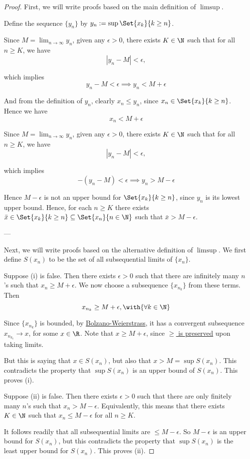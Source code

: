 \begin{proof}
  \def\X{\Set{x_k}{k\geq n}}

  First, we will write proofs based on the main definition of $\limsup$.

  Define the sequence $\{y_n\}$ by $y_n:=\sup\X$.

   Since $M=\displaystyle\lim_{n\to\infty}y_n$, given any
  $\epsilon>0$, there exists $K\in\N$ such that for all $n\geq K$, we have
  $$
    |y_n-M|<\epsilon,
  $$

  which implies
  $$
    y_n-M<\epsilon\implies y_n<M+\epsilon
  $$

  And from the definition of $y_n$, clearly $x_n\leq y_n$, since $x_n\in\X$.
  Hence we have
  $$
    x_n<M+\epsilon
  $$

   Since $M=\displaystyle\lim_{n\to\infty}y_n$, given any
  $\epsilon>0$, there exists $K\in\N$ such that for all $n\geq K$, we have
  $$
    |y_n-M|<\epsilon,
  $$

  which implies
  $$
    -(y_n-M)<\epsilon\implies y_n>M-\epsilon
  $$

  Hence $M-\epsilon$ is not an upper bound for $\X$, since $y_n$ is its lowest
  upper bound. Hence, for each $n\geq K$ there exists $\bar
  x\in\X\subseteq\Set{x_n}{n\in\N}$ such that $\bar x>M-\epsilon$.

  ---

  Next, we will write proofs based on the alternative definition of $\limsup$.
  We first define $S(x_n)$ to be the set of all subsequential limits of
  $\{x_n\}$.

   Suppose (i) is false. Then there exists $\epsilon>0$ such that
  there are infinitely many $n$'s such that $x_n\geq M+\epsilon$. We now choose
  a subsequence $\{x_{n_k}\}$ from these terms. Then
  $$
    x_{n_k}\geq M+\epsilon,\with{\forall k\in\N}
  $$

  Since $\{x_{n_k}\}$ is bounded, by \href{d277ad0}{Bolzano-Weierstrass}, it
  has a convergent subsequence $x_{n_{k_\ell}}\to x$, for some $x\in\R$. Note
  that $x\geq M+\epsilon$, since \href{d88455d}{$\geq$ is preserved} upon
  taking limits.

  But this is saying that $x\in S(x_n)$, but also that $x>M=\sup S(x_n)$. This
  contradicts the property that $\sup S(x_n)$ is an upper bound of $S(x_n)$.
  This proves (i).

   Suppose (ii) is false. Then there exists $\epsilon>0$ such that
  there are only finitely many $n$'s such that $x_n>M-\epsilon$. Equivalently,
  this means that there exists $K\in\N$ such that $x_n\leq M-\epsilon$ for all
  $n\geq K$.

  It follows readily that all subsequential limits are $\leq M-\epsilon$. So
  $M-\epsilon$ is an upper bound for $S(x_n)$, but this contradicts the
  property that $\sup S(x_n)$ is the least upper bound for $S(x_n)$. This
  proves (ii).
\end{proof}

